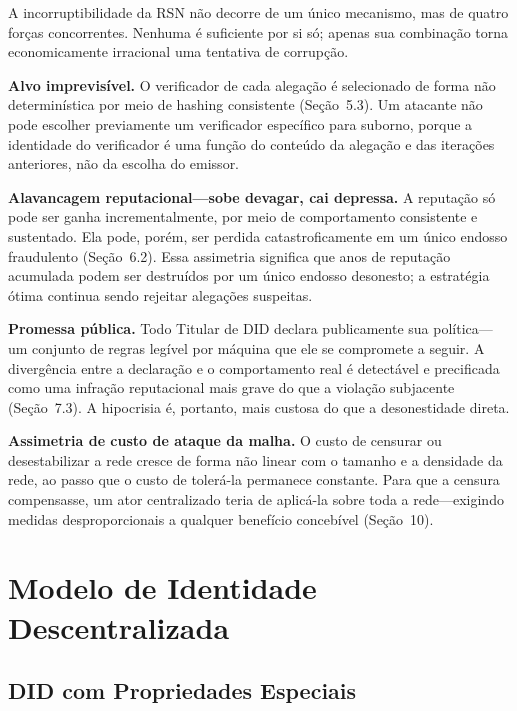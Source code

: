 \documentclass[11pt,a4paper,twocolumn]{article}
\begin{document}
A incorruptibilidade da RSN não decorre de um único mecanismo, mas de quatro forças concorrentes. Nenhuma é suficiente por si só; apenas sua combinação torna economicamente irracional uma tentativa de corrupção.

\textbf{Alvo imprevisível.} O verificador de cada alegação é selecionado de forma não determinística por meio de hashing consistente (Seção~5.3). Um atacante não pode escolher previamente um verificador específico para suborno, porque a identidade do verificador é uma função do conteúdo da alegação e das iterações anteriores, não da escolha do emissor.

\textbf{Alavancagem reputacional---sobe devagar, cai depressa.} A reputação só pode ser ganha incrementalmente, por meio de comportamento consistente e sustentado. Ela pode, porém, ser perdida catastroficamente em um único endosso fraudulento (Seção~6.2). Essa assimetria significa que anos de reputação acumulada podem ser destruídos por um único endosso desonesto; a estratégia ótima continua sendo rejeitar alegações suspeitas.

\textbf{Promessa pública.} Todo Titular de DID declara publicamente sua política---um conjunto de regras legível por máquina que ele se compromete a seguir. A divergência entre a declaração e o comportamento real é detectável e precificada como uma infração reputacional mais grave do que a violação subjacente (Seção~7.3). A hipocrisia é, portanto, mais custosa do que a desonestidade direta.

\textbf{Assimetria de custo de ataque da malha.} O custo de censurar ou desestabilizar a rede cresce de forma não linear com o tamanho e a densidade da rede, ao passo que o custo de tolerá-la permanece constante. Para que a censura compensasse, um ator centralizado teria de aplicá-la sobre toda a rede---exigindo medidas desproporcionais a qualquer benefício concebível (Seção~10).

\section{Modelo de Identidade Descentralizada}

\subsection{DID com Propriedades Especiais}
\end{document}
